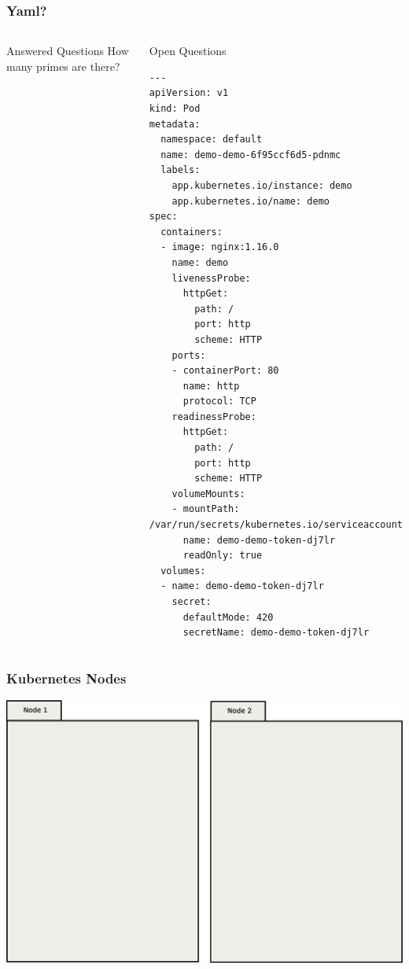 \documentclass{beamer}
\begin{document}
\begin{frame}[fragile]
\frametitle{Yaml?}
\begin{columns}
    \begin{block}{Answered Questions}
        How many primes are there?
    \end{block}
    \begin{block}{Open Questions}
\begin{verbatim}
---
apiVersion: v1
kind: Pod
metadata:
  namespace: default
  name: demo-demo-6f95ccf6d5-pdnmc
  labels:
    app.kubernetes.io/instance: demo
    app.kubernetes.io/name: demo
spec:
  containers:
  - image: nginx:1.16.0
    name: demo
    livenessProbe:
      httpGet:
        path: /
        port: http
        scheme: HTTP
    ports:
    - containerPort: 80
      name: http
      protocol: TCP
    readinessProbe:
      httpGet:
        path: /
        port: http
        scheme: HTTP
    volumeMounts:
    - mountPath: /var/run/secrets/kubernetes.io/serviceaccount
      name: demo-demo-token-dj7lr
      readOnly: true
  volumes:
  - name: demo-demo-token-dj7lr
    secret:
      defaultMode: 420
      secretName: demo-demo-token-dj7lr

\end{verbatim}
    \end{block}
\end{columns}
\end{frame}

\begin{frame}
\frametitle{Kubernetes Nodes}
\includegraphics[width=\textwidth,height=\textheight,keepaspectratio]{graphics/00-nodes.eps}
\end{frame}
\end{document}

